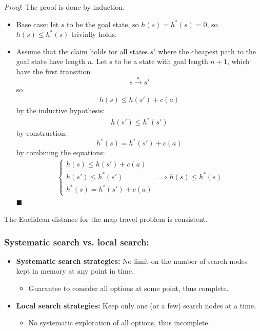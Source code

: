 \documentclass[10pt, letterpaper]{report}
\begin{document}
 \textit{Proof}: The proof is done by induction.\begin{itemize}
    \item Base case: let $s$ to be the goal state, so $h(s)=h^*(s)=0$, so $h(s)\le h^*(s)$ trivially holds.
    \item Assume that the claim holds for all states $s'$ where the cheapest path to the goal state have length $n$. Let $s$ to be a state with goal length $n+1$, which have the first transition$$s\xrightarrow{a}s' $$ so\begin{eqnarray}
        h(s)\le h(s')+c(a)
    \end{eqnarray}
    by the inductive hypothesis:\begin{eqnarray}
        h(s')\le h^*(s')
    \end{eqnarray}
    by construction:\begin{equation}
        h^*(s)=h^*(s')+c(a)
    \end{equation}
    by combining the equations:\begin{eqnarray}
        \begin{cases}
            h(s)\le h(s')+c(a)\\
            h(s')\le h^*(s')\\ 
            h^*(s)=h^*(s')+c(a)
        \end{cases}\implies h(s)\le h^*(s)
    \end{eqnarray}
    \hfill$\blacksquare$
 \end{itemize}
 The Euclidean distance for the map-travel problem is consistent.
 \subsubsection{Systematic search vs. local search:}
\begin{itemize}
    \item \textbf{Systematic search strategies:} No limit on the number of search nodes kept in memory at any point in time.
    \begin{itemize}
        \item[$\rightarrow$] Guarantee to consider all options at some point, thus complete.
    \end{itemize}
    \item \textbf{Local search strategies:} Keep only one (or a few) search nodes at a time.
    \begin{itemize}
        \item[$\rightarrow$] No systematic exploration of all options, thus incomplete.
    \end{itemize}
\end{itemize}
\end{document}
